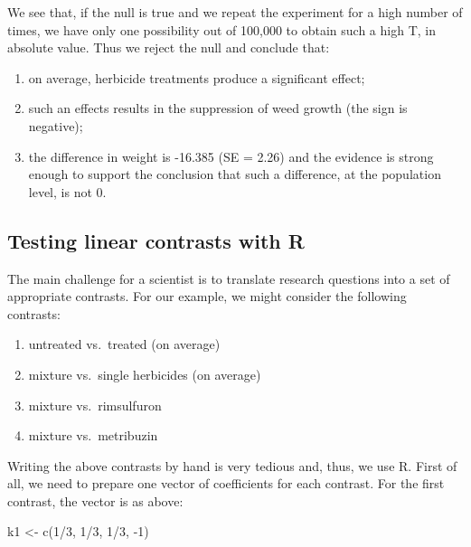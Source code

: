 \documentclass[a4paper,12pt,oneside]{book}
\providecommand{\tightlist}{%
  \setlength{\itemsep}{0pt}\setlength{\parskip}{0pt}}
\newenvironment{Shaded}{\begin{snugshade}}{\end{snugshade}}
\newcommand{\DecValTok}[1]{#1}
\newcommand{\SpecialCharTok}[1]{#1}
\newcommand{\OtherTok}[1]{#1}
\newcommand{\FunctionTok}[1]{#1}
\newcommand{\NormalTok}[1]{#1}
\begin{document}
We see that, if the null is true and we repeat the experiment for a high number of times, we have only one possibility out of 100,000 to obtain such a high T, in absolute value. Thus we reject the null and conclude that:

\begin{enumerate}
\def\labelenumi{\arabic{enumi}.}
\tightlist
\item
  on average, herbicide treatments produce a significant effect;
\item
  such an effects results in the suppression of weed growth (the sign is negative);
\item
  the difference in weight is -16.385 (SE = 2.26) and the evidence is strong enough to support the conclusion that such a difference, at the population level, is not 0.
\end{enumerate}

\hypertarget{testing-linear-contrasts-with-r}{%
\subsection{Testing linear contrasts with R}\label{testing-linear-contrasts-with-r}}

The main challenge for a scientist is to translate research questions into a set of appropriate contrasts. For our example, we might consider the following contrasts:

\begin{enumerate}
\def\labelenumi{\arabic{enumi}.}
\tightlist
\item
  untreated vs.~treated (on average)
\item
  mixture vs.~single herbicides (on average)
\item
  mixture vs.~rimsulfuron
\item
  mixture vs.~metribuzin
\end{enumerate}

Writing the above contrasts by hand is very tedious and, thus, we use R. First of all, we need to prepare one vector of coefficients for each contrast. For the first contrast, the vector is as above:

\begin{Shaded}
\begin{Highlighting}[]
\NormalTok{k1 }\OtherTok{\textless{}{-}} \FunctionTok{c}\NormalTok{(}\DecValTok{1}\SpecialCharTok{/}\DecValTok{3}\NormalTok{, }\DecValTok{1}\SpecialCharTok{/}\DecValTok{3}\NormalTok{, }\DecValTok{1}\SpecialCharTok{/}\DecValTok{3}\NormalTok{, }\SpecialCharTok{{-}}\DecValTok{1}\NormalTok{)}
\end{Highlighting}
\end{Shaded}
\end{document}

